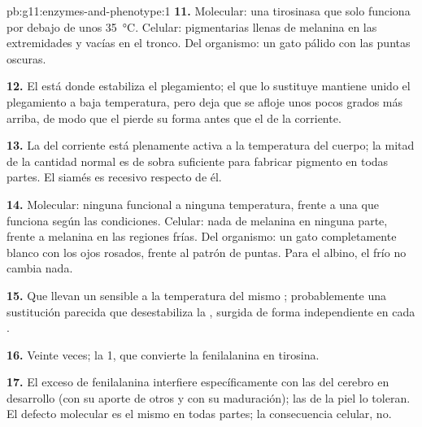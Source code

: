\begin{solution}{pb:g11:enzymes-and-phenotype:1}
\textbf{11.} Molecular: una tirosinasa que solo funciona por debajo de
unos \qty{35}{\celsius}. Celular:  pigmentarias llenas de
melanina en las extremidades y vacías en el tronco. Del organismo: un
gato pálido con las puntas oscuras.

\textbf{12.} El  está donde estabiliza el plegamiento; el que
lo sustituye mantiene unido el plegamiento a baja temperatura, pero
deja que se afloje unos pocos grados más arriba, de modo que el  pierde su forma antes que el de la  corriente.

\textbf{13.} La  del  corriente está plenamente activa a la
temperatura del cuerpo; la mitad de la cantidad normal es de sobra
suficiente para fabricar pigmento en todas partes. El  siamés es
recesivo respecto de él.

\textbf{14.} Molecular: ninguna  funcional a ninguna temperatura,
frente a una que funciona según las condiciones. Celular: nada de
melanina en ninguna parte, frente a melanina en las regiones frías. Del
organismo: un gato completamente blanco con los ojos rosados, frente al
patrón de puntas. Para el albino, el frío no cambia nada.

\textbf{15.} Que llevan un  sensible a la temperatura del mismo
; probablemente una sustitución parecida que desestabiliza la
, surgida de forma independiente en cada .

\textbf{16.} Veinte veces; la  1, que convierte la fenilalanina
en tirosina.

\textbf{17.} El exceso de fenilalanina interfiere específicamente con
las  del cerebro en desarrollo (con su aporte de otros
 y con su maduración); las  de la piel lo toleran. El
defecto molecular es el mismo en todas partes; la consecuencia celular,
no.


\end{solution}
